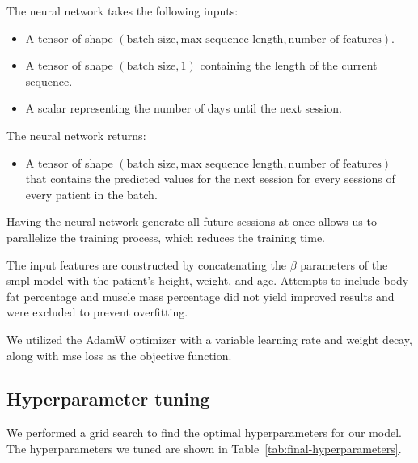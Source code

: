 The neural network takes the following inputs:

\begin{itemize}
    \item A tensor of shape $(\text{batch size}, \text{max sequence length}, \text{number
                  of features})$.
    \item A tensor of shape $(\text{batch size}, 1)$ containing the length of the current
          sequence.
    \item A scalar representing the number of days until the next session.
\end{itemize}

The neural network returns:

\begin{itemize}
    \item A tensor of shape $(\text{batch size}, \text{max sequence length}, \text{number
                  of features})$ that contains the predicted values for the next session for
          every sessions of every patient in the batch.
\end{itemize}

Having the neural network generate all future sessions at once allows us to
parallelize the training process, which reduces the training time.

The input features are constructed by concatenating the $\beta$ parameters of
the \gls{smpl} model with the patient's height, weight, and age. Attempts to
include body fat percentage and muscle mass percentage did not yield improved
results and were excluded to prevent overfitting.

We utilized the AdamW optimizer with a variable learning rate and weight decay,
along with \gls{mse} loss as the objective function.

\subsection{Hyperparameter tuning}

We performed a grid search to find the optimal hyperparameters for our model.
The hyperparameters we tuned are shown in
Table~\ref{tab:final-hyperparameters}.

